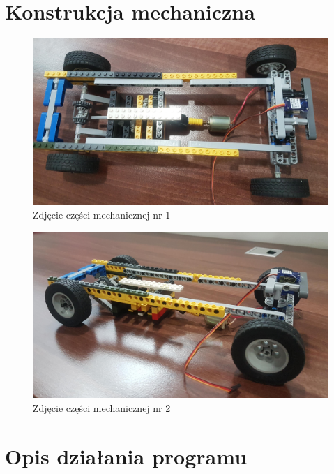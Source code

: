 \documentclass[10pt, a4paper]{article}
\begin{document}
\section{Konstrukcja mechaniczna}

	\begin{figure}[H]
		\centering
		\includegraphics[width=1\textwidth]{figures/20190410_135905.jpg}
		\caption{Zdjęcie części mechanicznej nr 1}
		\label{fig:Zdjęcie części mechanicznej nr 1}
	\end{figure}
	
		\begin{figure}[H]
		\centering
		\includegraphics[width=1\textwidth]{figures/20190410_135853.jpg}
		\caption{Zdjęcie części mechanicznej nr 2}
		\label{fig:Zdjęcie części mechanicznej nr 2}
	\end{figure}

\section{Opis działania programu}
\end{document}
